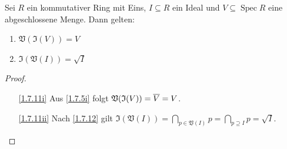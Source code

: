 \documentclass[a4paper,12pt]{scrbook}
\newtheorem{proof}{Beweis}
\def\V{\mathfrak{V}}
\def\I{\mathfrak{I}}
\newcommand{\Spec}{\operatorname{Spec}}
\def\Bar#1{\ensuremath\overline{#1}}
\begin{document}
\begin{prop}\label{1.7.11}
  Sei $R$ ein kommutativer Ring mit Eins, $I\subseteq R$ ein Ideal und $V\subseteq\Spec R$ eine abgeschlossene Menge. Dann
  gelten:
  \begin{enumerate}
  \item{} $\V(\I(V))=V$
  \item{} $\I(\V(I))=\sqrt{I}$
  \end{enumerate}
\end{prop}
\begin{proof}
  \begin{enumerate}
  \item[\ref{1.7.11i}] Aus \cref{1.7.5i} folgt $\V(\I(V))=\Bar{V}=V$.
  \item[\ref{1.7.11ii}] Nach \cref{1.7.12} gilt $\displaystyle\I(\V(I))=\bigcap_{p\in\V(I)}p=\bigcap_{p\supseteq I}p=\sqrt{I}$.
  \end{enumerate}
\end{proof}
\end{document}
